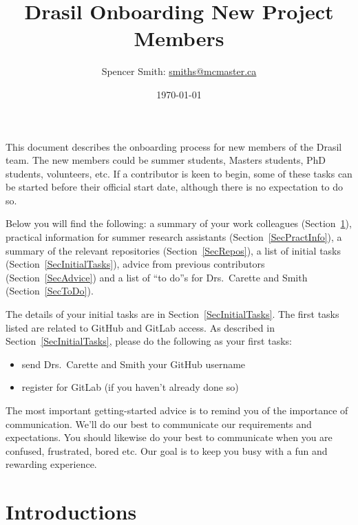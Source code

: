 \documentclass[12pt]{article}
\begin{document}
\title{Drasil Onboarding New Project Members}

\author{Spencer Smith: \href{mailto:smiths@mcmaster.ca}{smiths@mcmaster.ca}}
\date{\today}

\maketitle

\tableofcontents

\newpage

This document describes the onboarding process for new members of the Drasil
team.  The new members could be summer students, Masters students, PhD students,
volunteers, etc.  If a contributor is keen to begin, some of these tasks can be
started before their official start date, although there is no expectation to do
so.

Below you will find the following: a summary of your work colleagues
(Section~\ref{SecIntroductions}), practical information for summer research
assistants (Section~\ref{SecPractInfo}), a summary of the relevant repositories
(Section~\ref{SecRepos}), a list of initial tasks
(Section~\ref{SecInitialTasks}), advice from previous contributors
(Section~\ref{SecAdvice}) and a list of ``to do''s for Drs.\ Carette and Smith
(Section~\ref{SecToDo}).

The details of your initial tasks are in Section~\ref{SecInitialTasks}.  The
first tasks listed are related to GitHub and GitLab access.  As described in
Section~\ref{SecInitialTasks}, please do the following as your first tasks:

\begin{itemize}
\item send Drs.\ Carette and Smith your GitHub username
\item register for GitLab (if you haven't already done so)
\end{itemize}

The most important getting-started advice is to remind you of the importance of
communication.  We'll do our best to communicate our requirements and
expectations.  You should likewise do your best to communicate when you are
confused, frustrated, bored etc.  Our goal is to keep you busy with a fun and
rewarding experience.

\section{Introductions} \label{SecIntroductions}
\end{document}
